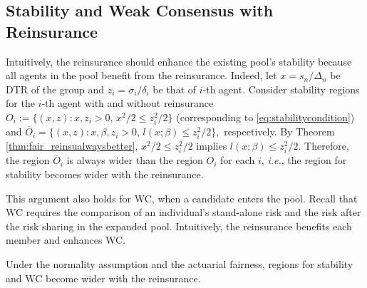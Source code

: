 \documentclass[fleqn,mnsc,nonblindrev]{informs4}
\begin{document}
\subsection{Stability and Weak Consensus with Reinsurance}
Intuitively, the reinsurance should enhance the existing pool's stability because all agents in the pool benefit from the reinsurance. Indeed, let $x=s_n/\Delta_n$ be DTR of the group and $z_i=\sigma_i/\delta_i$ be that of $i$-th agent. Consider stability regions for the $i$-th agent with and without reinsurance $O_i:=\{(x,z): x,z_i>0,\, x^2/2\leq z_i^2/2\}$ (corresponding to \eqref{eq:stabilitycondition}) and $\overline{O}_i=\{(x,z): x,\beta,z_i>0,\, l(x;\beta)\leq z_i^2/2\},$ respectively. By Theorem \ref{thm:fair_reinsualwaysbetter}, $x^2/2\leq z_i^2/2 $ implies $l(x;\beta)\leq z_i^2/2.$ Therefore, the region $\overline{O}_i$ is always wider than the region $O_i$ for each $i$, {\it i.e.}, the region for stability becomes wider with the reinsurance.

This argument also holds for WC, when a candidate enters the pool. Recall that WC requires the comparison of an individual's stand-alone risk and the risk after the risk sharing in the expanded pool. Intuitively, the reinsurance benefits each member and enhances WC.

\begin{theorem}\label{thm:fair_rein_weakstab}
Under the normality assumption and the actuarial fairness, regions for stability and WC become wider with the reinsurance.
\end{theorem}
\end{document}
